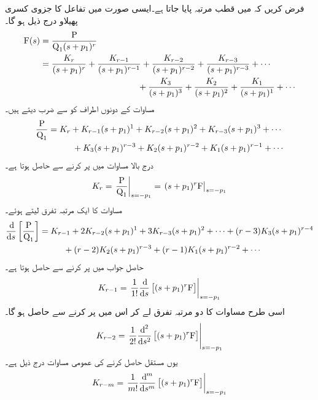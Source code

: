 فرض کریں کہ  میں  قطب  مرتبہ پایا جاتا ہے۔ایسی صورت میں تفاعل کا جزوی کسری پھیلاو درج ذیل ہو گا۔
\begin{align*}
\bF(s)&=\frac{\bP}{\bQ_1 (s+p_1)^r}\\
&=\frac{K_r}{(s+p_1)^r}+\frac{K_{r-1}}{(s+p_1)^{r-1}}+\frac{K_{r-2}}{(s+p_1)^{r-2}}+\frac{K_{r-3}}{(s+p_1)^{r-3}}+\cdots \\
&\hspace{4cm}+\frac{K_3}{(s+p_1)^3}+\frac{K_2}{(s+p_1)^2}+\frac{K_1}{(s+p_1)^1}+\cdots
\end{align*}
مساوات کے دونوں اطراف کو  سے ضرب دیتے ہیں۔
\begin{gather}
\begin{aligned}\label{مساوات_لاپلاس_کثیر_قطبین_الف}
\frac{{{\textup{P}}}}{{{\textup{Q}}}_1}&=K_r+K_{r-1}(s+p_1)^{1}+K_{r-2}(s+p_1)^{2}+K_{r-3}(s+p_1)^{3}+\cdots \\
&\hspace{1cm}+K_3(s+p_1)^{r-3}+K_2(s+p_1)^{r-2}+K_1(s+p_1)^{r-1}+\cdots
\end{aligned}
\end{gather}
درج بالا مساوات میں  پر کرنے سے  حاصل ہوتا ہے۔
\begin{align}
K_r=\left. \frac{{{\textup{P}}}}{{{\textup{Q}}}_1}\right|_{s=-p_1}=\left. (s+p_1)^r {{\textup{F}}}\right|_{s=-p_1}
\end{align}
مساوات  کا ایک مرتبہ تفرق لیتے ہوئے۔
\begin{gather}
\begin{aligned}\label{مساوات_لاپلاس_کثیر_قطبین_ب}
\frac{\dif }{\dif s}\left[\frac{\bP}{\bQ_1}\right]&=K_{r-1}+2K_{r-2}(s+p_1)^{1}+3K_{r-3}(s+p_1)^{2}+\cdots +(r-3)K_3(s+p_1)^{r-4}\\
&\hspace{1cm}+(r-2)K_2(s+p_1)^{r-3}+(r-1)K_1(s+p_1)^{r-2}+\cdots
\end{aligned}
\end{gather}
حاصل جواب میں  پر کرنے سے  حاصل ہوتا ہے۔
\begin{align}
K_{r-1}=\left. \frac{1}{1!}\frac{\dif}{\dif s}\left[(s+p_1)^r \bF\right]\right|_{s=-p_1}
\end{align}
اسی طرح مساوات  کا دو مرتبہ تفرق لے کر اس میں  پر کرنے سے  حاصل ہو گا۔
 \begin{align}
K_{r-2}=\left. \frac{1}{2!}\frac{\dif^{\,2}}{\dif s^2}\left[(s+p_1)^r \bF\right]\right|_{s=-p_1}
\end{align}
یوں مستقل حاصل کرنے کی عمومی مساوات درج ذیل ہے۔
  \begin{align}
K_{r-m}=\left. \frac{1}{m!}\frac{\dif^{\,m}}{\dif s^m}\left[(s+p_1)^r \bF\right]\right|_{s=-p_1}
\end{align}

